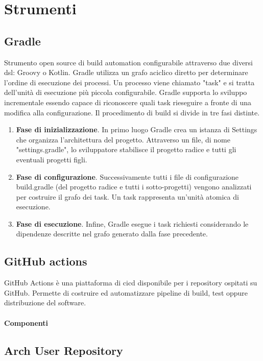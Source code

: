 \documentclass[12pt,a4paper,openright,twoside]{book}
\begin{document}
\section{Strumenti}

\subsection{Gradle}

Strumento open source di build automation configurabile attraverso due diversi \ac{dsl}: Groovy o Kotlin. Gradle utilizza un grafo aciclico diretto per determinare l'ordine di esecuzione dei processi. Un processo viene chiamato "task" e si tratta dell'unità di esecuzione più piccola configurabile. Gradle supporta lo sviluppo incrementale essendo capace di riconoscere quali task rieseguire a fronte di una modifica alla configurazione.
Il procedimento di build si divide in tre fasi distinte.
\begin{enumerate}
	\item \textbf{Fase di inizializzazione}. In primo luogo Gradle crea un istanza di Settings che organizza l'architettura del progetto. Attraverso un file, di nome "settings.gradle", lo sviluppatore stabilisce il progetto radice e tutti gli eventuali progetti figli. 
	\item \textbf{Fase di configurazione}. Successivamente tutti i file di configurazione build.gradle (del progetto radice e tutti i sotto-progetti) vengono analizzati per costruire il grafo dei task. Un task rappresenta un'unità atomica di esecuzione.
	\item \textbf{Fase di esecuzione}. Infine, Gradle esegue i task richiesti considerando le dipendenze descritte nel grafo generato dalla fase precedente.
\end{enumerate}
\subsection{GitHub actions}

GitHub Actions è una piattaforma di \ac{cicd} disponibile per i repository ospitati su GitHub. Permette di costruire ed automatizzare pipeline di build, test oppure distribuzione del software.

\paragraph{Componenti} 

\subsection{Arch User Repository}
\end{document}
